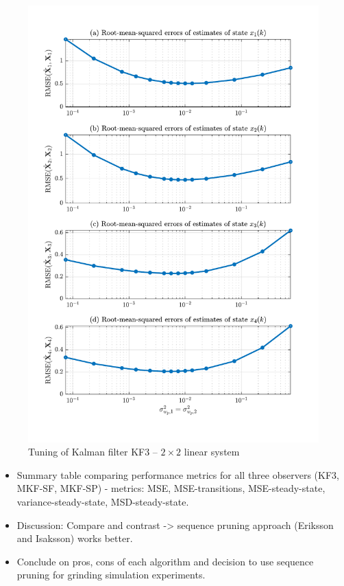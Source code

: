 \begin{figure}[htp]
	\centering
	\includegraphics[width=13cm]{images/rod_obs_sim2_3KF_Q_seed_0.pdf}
	\caption{Tuning of Kalman filter KF3 – $2\times2$ linear system}
	\label{fig:sim-sys-siso--KF3-tuning}
\end{figure}

\begin{itemize}
	\item Summary table comparing performance metrics for all three observers (KF3, MKF-SF, MKF-SP) - metrics: MSE, MSE-transitions, MSE-steady-state, variance-steady-state, MSD-steady-state.
	\item Discussion: Compare and contrast -> sequence pruning approach (Eriksson and Isaksson) works better.
	\item Conclude on pros, cons of each algorithm and decision to use sequence pruning for grinding simulation experiments.
\end{itemize}

